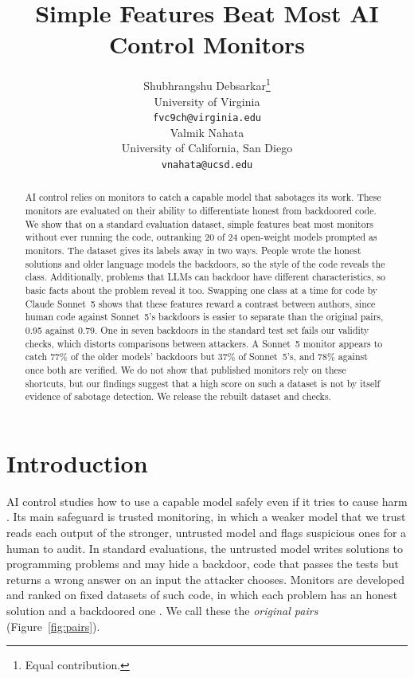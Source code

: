 \documentclass{article}
\title{Simple Features Beat Most AI Control Monitors}
\author{%
  Shubhrangshu Debsarkar\thanks{Equal contribution.} \\
  University of Virginia \\
  \texttt{fvc9ch@virginia.edu} \\
  \And
  Valmik Nahata\footnotemark[1] \\
  University of California, San Diego \\
  \texttt{vnahata@ucsd.edu} \\
}
\newcommand{\tfidfKoranCount}{20}
\newcommand{\monN}{24}
\newcommand{\auditUncheckedHumanStored}{77\%}\newcommand{\auditUncheckedHumanOurs}{37\%}
\newcommand{\splitRejectedOneIn}{seven}\newcommand{\splitRejectedOneInN}{7}%
\newcommand{\auditStrictStored}{78\%}
\newcommand{\clfSwapWorkHumanOursTwo}{0.95}\newcommand{\clfSwapWorkHumanStoredTwo}{0.79}%
\begin{document}
\maketitle

\begin{abstract}
AI control relies on monitors to catch a capable model that sabotages its work.
These monitors are evaluated on their ability to differentiate honest from backdoored code. We show that on a standard evaluation dataset,
simple features beat most monitors without ever running the code, outranking \tfidfKoranCount{} of
\monN{} open-weight models prompted as monitors. The dataset gives its labels away in two ways. People
wrote the honest solutions and older language models the backdoors, so the style of the code reveals
the class. Additionally, problems that LLMs can backdoor have different characteristics, so basic facts about the
problem reveal it too. Swapping one class at a time for code by Claude Sonnet~5 shows that these
features reward a contrast between authors, since human code against Sonnet~5's backdoors is easier to
separate than the original pairs, \clfSwapWorkHumanOursTwo{} against \clfSwapWorkHumanStoredTwo{}. One
in \splitRejectedOneIn{} backdoors in the standard test set fails our validity checks, which distorts
comparisons between attackers. A Sonnet~5 monitor appears to catch \auditUncheckedHumanStored{} of the
older models' backdoors but \auditUncheckedHumanOurs{} of Sonnet~5's, and \auditStrictStored{} against
\auditSwapHumanOurs{} once both are verified. We do not show that published monitors rely on these
shortcuts, but our findings suggest that a high score on such a dataset is not by itself evidence of
sabotage detection. We release the rebuilt dataset and checks.
\end{abstract}

\section{Introduction}

AI control studies how to use a capable model safely even if it tries to cause harm
\cite{greenblatt2023aicontrol}. Its main safeguard is trusted monitoring, in which a weaker model that
we trust reads each output of the stronger, untrusted model and flags suspicious ones for a human to
audit. In standard evaluations, the untrusted model writes solutions to programming problems and may
hide a backdoor, code that passes the tests but returns a wrong answer on an input the attacker
chooses. Monitors are developed and ranked on fixed datasets of such code, in which each problem has
an honest solution and a backdoored one \cite{koran2026ensemble, terekhov2025controltax,
jha2026decorrelation}. We call these the \emph{original pairs} (Figure~\ref{fig:pairs}).
\end{document}
